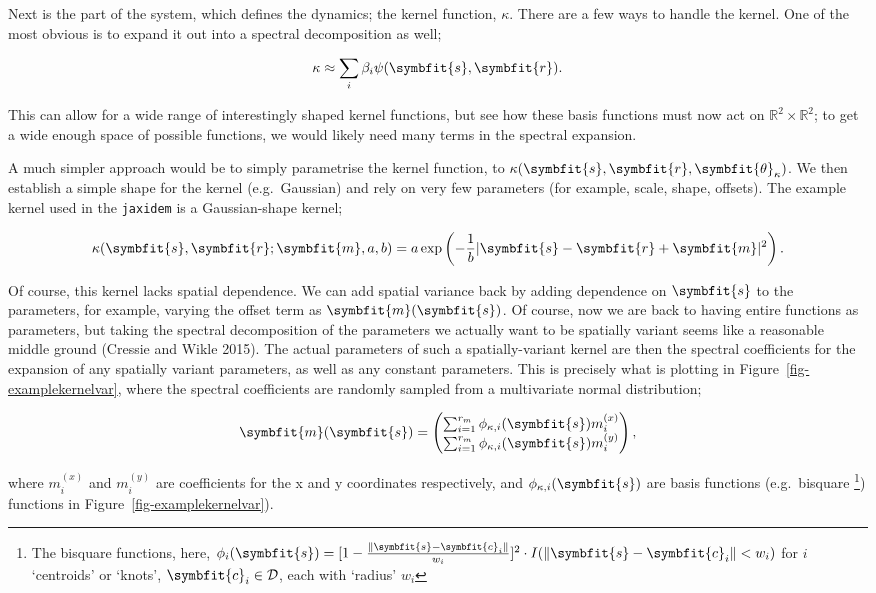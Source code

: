 \documentclass[
]{report}
\newcommand{\bv}[1]{\symbfit{#1}}
\theoremstyle{plain}
\theoremstyle{plain}
\theoremstyle{plain}
\theoremstyle{remark}
\begin{document}
Next is the part of the system, which defines the dynamics; the kernel
function, \(\kappa\). There are a few ways to handle the kernel. One of
the most obvious is to expand it out into a spectral decomposition as
well;

\[\kappa \approx \sum_i \beta_i\psi(\bv s, \bv r).
\]

This can allow for a wide range of interestingly shaped kernel
functions, but see how these basis functions must now act on
\(\mathbb R^2\times \mathbb R^2\); to get a wide enough space of
possible functions, we would likely need many terms in the spectral
expansion.

A much simpler approach would be to simply parametrise the kernel
function, to \(\kappa(\bv s, \bv r, \bv \theta_\kappa)\). We then
establish a simple shape for the kernel (e.g.~Gaussian) and rely on very
few parameters (for example, scale, shape, offsets). The example kernel
used in the \texttt{jaxidem} is a Gaussian-shape kernel;

\[\kappa(\bv s, \bv r; \bv m, a, b) = a \exp \left( -\frac{1}{b} \vert \bv s- \bv r +\bv m\vert^2 \right). 
\]

Of course, this kernel lacks spatial dependence. We can add spatial
variance back by adding dependence on \(\bv s\) to the parameters, for
example, varying the offset term as \(\bv m(\bv s)\). Of course, now we
are back to having entire functions as parameters, but taking the
spectral decomposition of the parameters we actually want to be
spatially variant seems like a reasonable middle ground (Cressie and
Wikle 2015). The actual parameters of such a spatially-variant kernel
are then the spectral coefficients for the expansion of any spatially
variant parameters, as well as any constant parameters. This is
precisely what is plotting in Figure~\ref{fig-examplekernelvar}, where
the spectral coefficients are randomly sampled from a multivariate
normal distribution;

\[\begin{split}
  \bv m(\bv s) = \left(\begin{matrix}
    \sum_{i=1}^{r_m} \phi_{\kappa,i}(\bv s) m^{(x)}_i\\
    \sum_{i=1}^{r_m} \phi_{\kappa,i}(\bv s) m^{(y)}_i
  \end{matrix}\right),
\end{split}
\]

where \(m^{(x)}_i\) and \(m^{(y)}_i\) are coefficients for the x and y
coordinates respectively, and \(\phi_{\kappa, i}(\bv s)\) are basis
functions (e.g.~bisquare \footnote{The bisquare functions, here,
  \(\phi_i(\bv s) = [1-\frac{\Vert \bv s - \bv c_i \Vert}{w_i}]^2 \cdot I(\Vert \bv s - \bv c_i \Vert < w_i)\)
  for \(i\) `centroids' or `knots', \(\bv c_i\in \mathcal D\), each with
  `radius' \(w_i\)}) functions in Figure~\ref{fig-examplekernelvar}).
\end{document}
